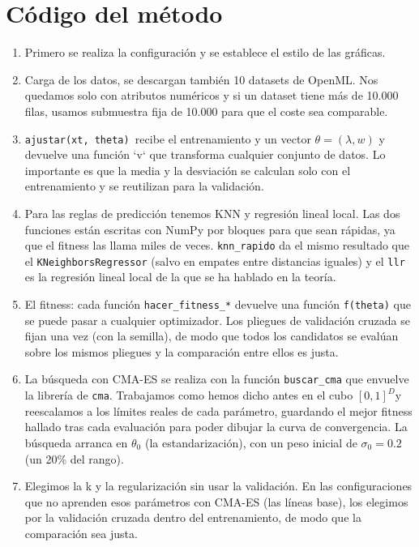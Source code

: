 \section{Código del método}
\begin{enumerate}
    \item Primero se realiza la configuración y se establece el estilo de las gráficas.
    \item Carga de los datos, se descargan también 10 datasets de OpenML. Nos quedamos solo con atributos numéricos y si un dataset tiene más de 10.000 filas, usamos submuestra fija de 10.000 para que el coste sea comparable.
    \item \texttt{ajustar(xt, theta) }recibe el entrenamiento y un vector $\theta=(\lambda, w)$ y devuelve una función `v` que transforma cualquier conjunto de datos. Lo importante es que la media y la desviación se calculan solo con el entrenamiento y se reutilizan para la validación.
    \item Para las reglas de predicción tenemos KNN y regresión lineal local. Las dos funciones están escritas con NumPy por bloques para que sean rápidas, ya que el fitness las llama miles de veces. \texttt{knn\_rapido} da el mismo resultado que el \texttt{KNeighborsRegressor} (salvo en empates entre distancias iguales) y el \texttt{llr} es la regresión lineal local de la que se ha hablado en la teoría.

    \item El fitness: cada función \texttt{hacer\_fitness\_*} devuelve una función \texttt{f(theta)} que se puede pasar a cualquier optimizador. Los pliegues de validación cruzada se fijan una vez (con la semilla), de modo que todos los candidatos se evalúan sobre los mismos pliegues y la comparación entre ellos es justa.

    \item La búsqueda con CMA-ES se realiza con la función \texttt{buscar\_cma} que envuelve la librería de \texttt{cma}. Trabajamos como hemos dicho antes en el cubo $[0,1]^D$y reescalamos a los límites reales de cada parámetro, guardando el mejor fitness hallado tras cada evaluación para poder dibujar la curva de convergencia. La búsqueda arranca en $\theta_0$ (la estandarización), con un peso inicial de $\sigma_0=0.2$ (un 20\% del rango). 

    \item Elegimos la k y la regularización sin usar la validación. En las configuraciones que no aprenden esos parámetros con CMA-ES (las líneas base), los elegimos por la validación cruzada dentro del entrenamiento, de modo que la comparación sea justa.
\end{enumerate}